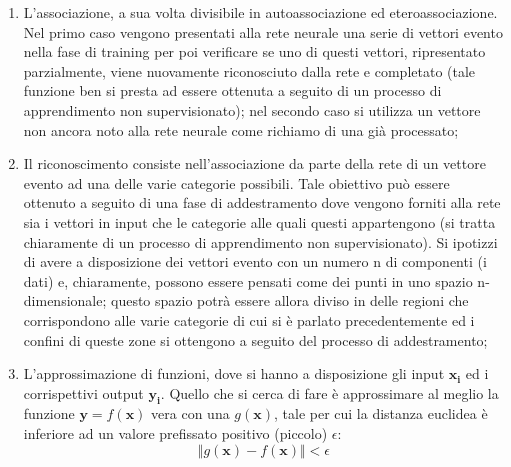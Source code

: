 \begin{enumerate}
	\item L'associazione, a sua volta divisibile in autoassociazione ed eteroassociazione. Nel primo caso vengono presentati alla rete neurale una serie di vettori evento nella fase di training per poi verificare se uno di questi vettori, ripresentato parzialmente, viene nuovamente riconosciuto dalla rete e completato (tale funzione ben si presta ad essere ottenuta a seguito di un processo di apprendimento non supervisionato); nel secondo caso si utilizza un vettore non ancora noto alla rete neurale come richiamo di una già processato;
	\item Il riconoscimento consiste nell'associazione da parte della rete di un vettore evento ad una delle varie categorie possibili. Tale obiettivo può essere ottenuto a seguito di una fase di addestramento dove vengono forniti alla rete sia i vettori in input che le categorie alle quali questi appartengono (si tratta chiaramente di un processo di apprendimento non supervisionato). Si ipotizzi di avere a disposizione dei vettori evento con un numero n di componenti (i dati) e, chiaramente, possono essere pensati come dei punti in uno spazio n-dimensionale; questo spazio potrà essere allora diviso in delle regioni che corrispondono alle varie categorie di cui si è parlato precedentemente ed i confini di queste zone si ottengono a seguito del processo di addestramento;
	\item L'approssimazione di funzioni, dove si hanno a disposizione gli input $\textbf{x}_\textbf{i}$ ed i corrispettivi output $\textbf{y}_\textbf{i}$. Quello che si cerca di fare è approssimare al meglio la funzione $\textbf{y} = f(\textbf{x})$ vera con una $g(\textbf{x})$, tale per cui la distanza euclidea è inferiore ad un valore prefissato positivo (piccolo) $\epsilon$:
	\begin{equation}
	\Vert g(\textbf{x}) - f(\textbf{x}) \Vert < \epsilon
	\end{equation}
\end{enumerate}

